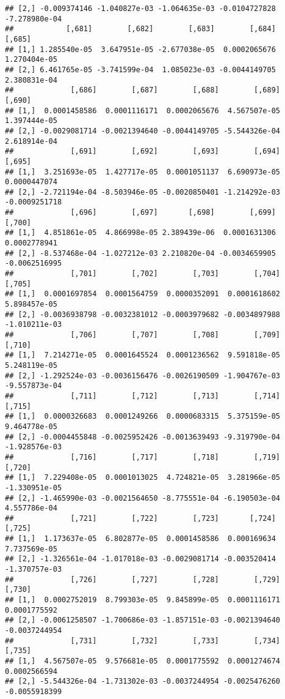 \documentclass[
]{article}
\begin{document}
\begin{verbatim}
## [2,] -0.009374146 -1.040827e-03 -1.064635e-03 -0.0104727828 -7.278980e-04
##            [,681]        [,682]        [,683]        [,684]       [,685]
## [1,] 1.285540e-05  3.647951e-05 -2.677038e-05  0.0002065676 1.270404e-05
## [2,] 6.461765e-05 -3.741599e-04  1.085023e-03 -0.0044149705 2.380831e-04
##             [,686]        [,687]        [,688]        [,689]       [,690]
## [1,]  0.0001458586  0.0001116171  0.0002065676  4.567507e-05 1.397444e-05
## [2,] -0.0029081714 -0.0021394640 -0.0044149705 -5.544326e-04 2.618914e-04
##             [,691]        [,692]        [,693]        [,694]        [,695]
## [1,]  3.251693e-05  1.427717e-05  0.0001051137  6.690973e-05  0.0000447074
## [2,] -2.721194e-04 -8.503946e-05 -0.0020850401 -1.214292e-03 -0.0009251718
##             [,696]        [,697]       [,698]        [,699]        [,700]
## [1,]  4.851861e-05  4.866998e-05 2.389439e-06  0.0001631306  0.0002778941
## [2,] -8.537468e-04 -1.027212e-03 2.210820e-04 -0.0034659905 -0.0062516995
##             [,701]        [,702]        [,703]        [,704]        [,705]
## [1,]  0.0001697854  0.0001564759  0.0000352091  0.0001618602  5.898457e-05
## [2,] -0.0036938798 -0.0032381012 -0.0003979682 -0.0034897988 -1.010211e-03
##             [,706]        [,707]        [,708]        [,709]        [,710]
## [1,]  7.214271e-05  0.0001645524  0.0001236562  9.591818e-05  5.248119e-05
## [2,] -1.292524e-03 -0.0036156476 -0.0026190509 -1.904767e-03 -9.557873e-04
##             [,711]        [,712]        [,713]        [,714]        [,715]
## [1,]  0.0000326683  0.0001249266  0.0000683315  5.375159e-05  9.464778e-05
## [2,] -0.0004455848 -0.0025952426 -0.0013639493 -9.319790e-04 -1.928576e-03
##             [,716]        [,717]        [,718]        [,719]        [,720]
## [1,]  7.229408e-05  0.0001013025  4.724821e-05  3.281966e-05 -1.330951e-05
## [2,] -1.465990e-03 -0.0021564650 -8.775551e-04 -6.190503e-04  4.557786e-04
##             [,721]        [,722]        [,723]       [,724]        [,725]
## [1,]  1.173637e-05  6.802877e-05  0.0001458586  0.000169634  7.737569e-05
## [2,] -1.326561e-04 -1.017018e-03 -0.0029081714 -0.003520414 -1.370757e-03
##             [,726]        [,727]        [,728]        [,729]        [,730]
## [1,]  0.0002752019  8.799303e-05  9.845899e-05  0.0001116171  0.0001775592
## [2,] -0.0061258507 -1.700686e-03 -1.857151e-03 -0.0021394640 -0.0037244954
##             [,731]        [,732]        [,733]        [,734]        [,735]
## [1,]  4.567507e-05  9.576681e-05  0.0001775592  0.0001274674  0.0002566594
## [2,] -5.544326e-04 -1.731302e-03 -0.0037244954 -0.0025476260 -0.0055918399

\end{verbatim}
\end{document}
